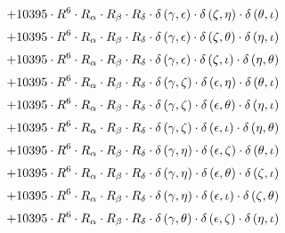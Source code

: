 \begin{subequations}
\begin{gather}
 \\[0.2em] \notag 		 + 10395 \cdot R^{6} \cdot R_{\alpha{}} \cdot R_{\beta{}} \cdot R_{\delta{}} \cdot \delta{}\left(\gamma{}, \epsilon{}\right) \cdot \delta{}\left(\zeta{}, \eta{}\right) \cdot \delta{}\left(\theta{}, \iota{}\right) 
 \\[0.2em] \notag 		 + 10395 \cdot R^{6} \cdot R_{\alpha{}} \cdot R_{\beta{}} \cdot R_{\delta{}} \cdot \delta{}\left(\gamma{}, \epsilon{}\right) \cdot \delta{}\left(\zeta{}, \theta{}\right) \cdot \delta{}\left(\eta{}, \iota{}\right) 
 \\[0.2em] \notag 		 + 10395 \cdot R^{6} \cdot R_{\alpha{}} \cdot R_{\beta{}} \cdot R_{\delta{}} \cdot \delta{}\left(\gamma{}, \epsilon{}\right) \cdot \delta{}\left(\zeta{}, \iota{}\right) \cdot \delta{}\left(\eta{}, \theta{}\right) 
 \\[0.2em] \notag 		 + 10395 \cdot R^{6} \cdot R_{\alpha{}} \cdot R_{\beta{}} \cdot R_{\delta{}} \cdot \delta{}\left(\gamma{}, \zeta{}\right) \cdot \delta{}\left(\epsilon{}, \eta{}\right) \cdot \delta{}\left(\theta{}, \iota{}\right) 
 \\[0.2em] \notag 		 + 10395 \cdot R^{6} \cdot R_{\alpha{}} \cdot R_{\beta{}} \cdot R_{\delta{}} \cdot \delta{}\left(\gamma{}, \zeta{}\right) \cdot \delta{}\left(\epsilon{}, \theta{}\right) \cdot \delta{}\left(\eta{}, \iota{}\right) 
 \\[0.2em] \notag 		 + 10395 \cdot R^{6} \cdot R_{\alpha{}} \cdot R_{\beta{}} \cdot R_{\delta{}} \cdot \delta{}\left(\gamma{}, \zeta{}\right) \cdot \delta{}\left(\epsilon{}, \iota{}\right) \cdot \delta{}\left(\eta{}, \theta{}\right) 
 \\[0.2em] \notag 		 + 10395 \cdot R^{6} \cdot R_{\alpha{}} \cdot R_{\beta{}} \cdot R_{\delta{}} \cdot \delta{}\left(\gamma{}, \eta{}\right) \cdot \delta{}\left(\epsilon{}, \zeta{}\right) \cdot \delta{}\left(\theta{}, \iota{}\right) 
 \\[0.2em] \notag 		 + 10395 \cdot R^{6} \cdot R_{\alpha{}} \cdot R_{\beta{}} \cdot R_{\delta{}} \cdot \delta{}\left(\gamma{}, \eta{}\right) \cdot \delta{}\left(\epsilon{}, \theta{}\right) \cdot \delta{}\left(\zeta{}, \iota{}\right) 
 \\[0.2em] \notag 		 + 10395 \cdot R^{6} \cdot R_{\alpha{}} \cdot R_{\beta{}} \cdot R_{\delta{}} \cdot \delta{}\left(\gamma{}, \eta{}\right) \cdot \delta{}\left(\epsilon{}, \iota{}\right) \cdot \delta{}\left(\zeta{}, \theta{}\right) 
 \\[0.2em] \notag 		 + 10395 \cdot R^{6} \cdot R_{\alpha{}} \cdot R_{\beta{}} \cdot R_{\delta{}} \cdot \delta{}\left(\gamma{}, \theta{}\right) \cdot \delta{}\left(\epsilon{}, \zeta{}\right) \cdot \delta{}\left(\eta{}, \iota{}\right) 

\end{gather}
\end{subequations}
